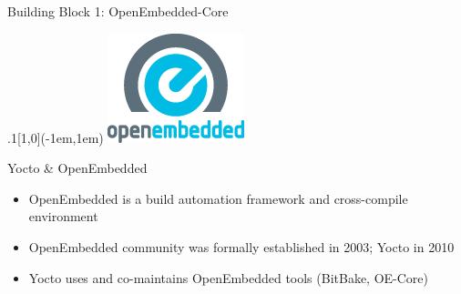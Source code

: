 \documentclass[ucs,9pt]{beamer}
\begin{document}
\begin{frame}
    {Building Block 1: OpenEmbedded-Core}

    \begin{textblock*}{.1\paperwidth}[1,0](\paperwidth-1em,1em)%
        \includegraphics[width=\linewidth]{images/oe-logo}
    \end{textblock*}%

    \begin{block}{Yocto \& OpenEmbedded}
        \begin{itemize}
         \item OpenEmbedded is a build automation framework and cross-compile environment
         \item OpenEmbedded community was formally established in 2003; Yocto in 2010
         \item Yocto uses and co-maintains OpenEmbedded tools (BitBake, OE-Core)
        \end{itemize}
    \end{block}
    \pause


\end{frame}
\end{document}
